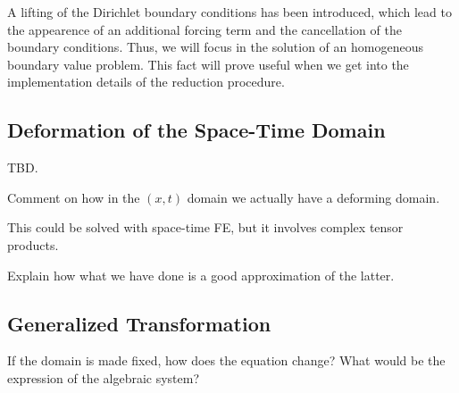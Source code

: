 \documentclass[../main.tex]{subfiles}
\begin{document}
A lifting of the Dirichlet boundary conditions has been introduced, which lead to the appearence of an additional forcing term and the cancellation of the boundary conditions.
Thus, we will focus in the solution of an homogeneous boundary value problem.
This fact will prove useful when we get into the implementation details of the reduction procedure.

\subsection{Deformation of the Space-Time Domain}
TBD.

Comment on how in the $(x,t)$ domain we actually have a deforming domain. 

This could be solved with space-time FE, but it involves complex tensor products. 

Explain how what we have done is a good approximation of the latter.

\subsection{Generalized Transformation}
If the domain is made fixed, 
how does the equation change?
What would be the expression of the algebraic system?
\end{document}
